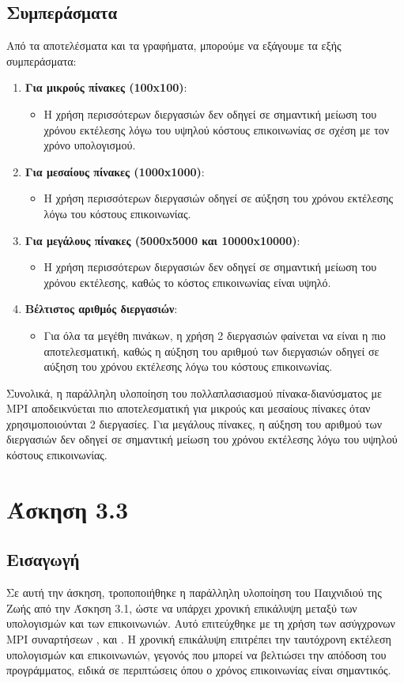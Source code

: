 \documentclass{article}
\begin{document}
\subsection*{Συμπεράσματα}
Από τα αποτελέσματα και τα γραφήματα, μπορούμε να εξάγουμε τα εξής συμπεράσματα:
\begin{enumerate}
    \item \textbf{Για μικρούς πίνακες (100x100)}:
    \begin{itemize}
        \item Η χρήση περισσότερων διεργασιών δεν οδηγεί σε σημαντική μείωση του χρόνου εκτέλεσης λόγω του υψηλού κόστους επικοινωνίας σε σχέση με τον χρόνο υπολογισμού.
    \end{itemize}
    \item \textbf{Για μεσαίους πίνακες (1000x1000)}:
    \begin{itemize}
        \item Η χρήση περισσότερων διεργασιών οδηγεί σε αύξηση του χρόνου εκτέλεσης λόγω του κόστους επικοινωνίας.
    \end{itemize}
    \item \textbf{Για μεγάλους πίνακες (5000x5000 και 10000x10000)}:
    \begin{itemize}
        \item Η χρήση περισσότερων διεργασιών δεν οδηγεί σε σημαντική μείωση του χρόνου εκτέλεσης, καθώς το κόστος επικοινωνίας είναι υψηλό.
    \end{itemize}
    \item \textbf{Βέλτιστος αριθμός διεργασιών}:
    \begin{itemize}
        \item Για όλα τα μεγέθη πινάκων, η χρήση 2 διεργασιών φαίνεται να είναι η πιο αποτελεσματική, καθώς η αύξηση του αριθμού των διεργασιών οδηγεί σε αύξηση του χρόνου εκτέλεσης λόγω του κόστους επικοινωνίας.
    \end{itemize}
\end{enumerate}
Συνολικά, η παράλληλη υλοποίηση του πολλαπλασιασμού πίνακα-διανύσματος με MPI αποδεικνύεται πιο αποτελεσματική για μικρούς και μεσαίους πίνακες όταν χρησιμοποιούνται 2 διεργασίες. Για μεγάλους πίνακες, η αύξηση του αριθμού των διεργασιών δεν οδηγεί σε σημαντική μείωση του χρόνου εκτέλεσης λόγω του υψηλού κόστους επικοινωνίας.
\section*{Άσκηση 3.3}
\subsection*{Εισαγωγή}
Σε αυτή την άσκηση, τροποποιήθηκε η παράλληλη υλοποίηση του Παιχνιδιού της Ζωής από την Άσκηση 3.1, ώστε να υπάρχει χρονική επικάλυψη μεταξύ των υπολογισμών και των επικοινωνιών. Αυτό επιτεύχθηκε με τη χρήση των ασύγχρονων MPI συναρτήσεων \texttt{}, \texttt{} και \texttt{}. Η χρονική επικάλυψη επιτρέπει την ταυτόχρονη εκτέλεση υπολογισμών και επικοινωνιών, γεγονός που μπορεί να βελτιώσει την απόδοση του προγράμματος, ειδικά σε περιπτώσεις όπου ο χρόνος επικοινωνίας είναι σημαντικός.
\end{document}
